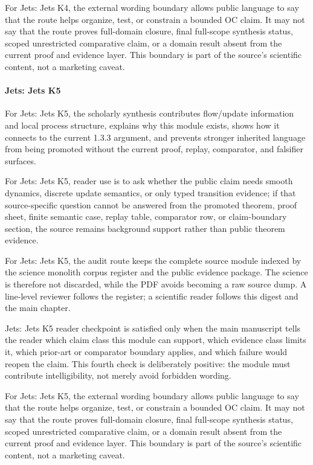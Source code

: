 For Jets: Jets K4, the external wording boundary allows public language to say that the route helps organize, test, or constrain a bounded OC claim. It may not say that the route proves full-domain closure, final full-scope synthesis status, scoped unrestricted comparative claim, or a domain result absent from the current proof and evidence layer. This boundary is part of the source's scientific content, not a marketing caveat.


\paragraph{Jets: Jets K5}

For Jets: Jets K5, the scholarly synthesis contributes flow/update information and local process structure, explains why this module exists, shows how it connects to the current 1.3.3 argument, and prevents stronger inherited language from being promoted without the current proof, replay, comparator, and falsifier surfaces.


For Jets: Jets K5, reader use is to ask whether the public claim needs smooth dynamics, discrete update semantics, or only typed transition evidence; if that source-specific question cannot be answered from the promoted theorem, proof sheet, finite semantic case, replay table, comparator row, or claim-boundary section, the source remains background support rather than public theorem evidence.


For Jets: Jets K5, the audit route keeps the complete source module indexed by the science monolith corpus register and the public evidence package. The science is therefore not discarded, while the PDF avoids becoming a raw source dump. A line-level reviewer follows the register; a scientific reader follows this digest and the main chapter.


Jets: Jets K5 reader checkpoint is satisfied only when the main manuscript tells the reader which claim class this module can support, which evidence class limits it, which prior-art or comparator boundary applies, and which failure would reopen the claim. This fourth check is deliberately positive: the module must contribute intelligibility, not merely avoid forbidden wording.


For Jets: Jets K5, the external wording boundary allows public language to say that the route helps organize, test, or constrain a bounded OC claim. It may not say that the route proves full-domain closure, final full-scope synthesis status, scoped unrestricted comparative claim, or a domain result absent from the current proof and evidence layer. This boundary is part of the source's scientific content, not a marketing caveat.


